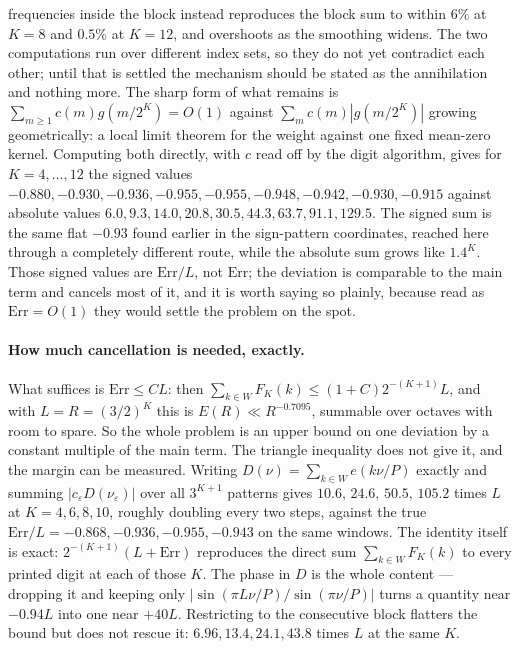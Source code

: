 \documentclass[11pt]{article}
\theoremstyle{remark}
\newcommand{\eps}{\varepsilon}
\begin{document}
frequencies inside the block instead reproduces the block sum to within $6\%$ at $K=8$ and $0.5\%$ at
$K=12$, and overshoots as the smoothing widens. The two computations run over different index sets, so
they do not yet contradict each other; until that is settled the mechanism should be stated as the
annihilation and nothing more. The sharp form of what remains is
$\sum_{m\ge1}c(m)g(m/2^K)=O(1)$ against $\sum_mc(m)|g(m/2^K)|$ growing geometrically: a local limit
theorem for the weight against one fixed mean-zero kernel. Computing both directly, with $c$ read off by
the digit algorithm, gives for $K=4,\dots,12$ the signed values
$-0.880,-0.930,-0.936,-0.955,-0.955,-0.948,-0.942,-0.930,-0.915$
against absolute values $6.0,9.3,14.0,20.8,30.5,44.3,63.7,91.1,129.5$. The signed sum is the same flat
$-0.93$ found earlier in the sign-pattern coordinates, reached here through a completely different
route, while the absolute sum grows like $1.4^K$. Those signed values are $\mathrm{Err}/L$, not
$\mathrm{Err}$; the deviation is comparable to the main term and cancels most of it, and it is worth
saying so plainly, because read as $\mathrm{Err}=O(1)$ they would settle the problem on the spot.

\begin{sloppypar}
\paragraph{How much cancellation is needed, exactly.} What suffices is $\mathrm{Err}\le CL$: then
$\sum_{k\in W}F_K(k)\le(1+C)2^{-(K+1)}L$, and with $L=R=(3/2)^K$ this is $E(R)\ll R^{-0.7095}$, summable
over octaves with room to spare. So the whole problem is an upper bound on one deviation by a constant
multiple of the main term. The triangle inequality does not give it, and the margin can be measured.
Writing $D(\nu)=\sum_{k\in W}e(k\nu/P)$ exactly and summing $|c_\eps D(\nu_\eps)|$ over all $3^{K+1}$
patterns gives $10.6,\,24.6,\,50.5,\,105.2$ times $L$ at $K=4,6,8,10$, roughly doubling every two
steps, against the true $\mathrm{Err}/L=-0.868,-0.936,-0.955,-0.943$ on the same windows. The identity
itself is exact: $2^{-(K+1)}(L+\mathrm{Err})$ reproduces the direct sum $\sum_{k\in W}F_K(k)$ to every
printed digit at each of those $K$. The phase in $D$ is the whole content --- dropping it and keeping
only $|\sin(\pi L\nu/P)/\sin(\pi\nu/P)|$ turns a quantity near $-0.94L$ into one near $+40L$.
Restricting to the consecutive block flatters the bound but does not rescue it: $6.96,13.4,24.1,43.8$
times $L$ at the same $K$.
\end{sloppypar}
\end{document}
